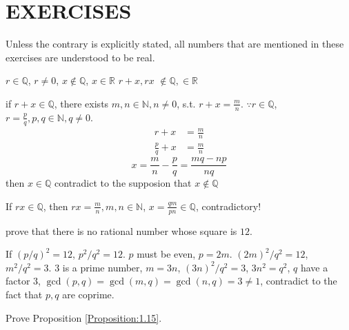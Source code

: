 \section*{EXERCISES}

Unless the contrary is explicitly stated, all numbers that are mentioned in these exercises are understood to be real.

\begin{myExercise}
    $r \in \mathbb{Q}$, $r \neq 0$, $x \not\in \mathbb{Q}$, $x \in \mathbb{R}$
    $r+x, rx$ $\not\in \mathbb{Q}, \in \mathbb{R}$
\end{myExercise}

\begin{mySolve}
if $r+x \in \mathbb{Q}$, there exists $m, n \in \mathbb{N}, n \neq 0$, s.t. $r+x = \frac{m}{n}$.
$\because r\in \mathbb{Q}$, $r = \frac{p}{q}, p,q \in \mathbb{N}, q \neq 0$.
\begin{align*}
    r + x &= \frac{m}{n}\\
    \frac{p}{q} + x &= \frac{m}{n}
\end{align*}
\begin{equation*}
    x = \frac{m}{n} - \frac{p}{q} = \frac{mq-np}{nq}
\end{equation*}
then $x \in \mathbb{Q}$ contradict to the supposion that $x \not\in \mathbb{Q}$

If $rx \in \mathbb{Q}$, then $rx = \frac{m}{n}, m,n\in \mathbb{N}$, $x = \frac{qm}{pn} \in \mathbb{Q}$, contradictory!
\end{mySolve}



\begin{myExercise}
   prove that there is no rational number whose square is $12$. 
\end{myExercise}

\begin{mySolve}
    If $\left(p/q\right)^2 = 12$, $p^2/q^2 = 12$. $p$ must be even, $p = 2m$.
    $(2m)^2/q^2 = 12$, $m^2/q^2=3$. 
    $3$ is a prime number, $m = 3n$, $(3n)^2/q^2 = 3$, $3n^2 = q^2$, $q$ have a factor $3$,
    $\gcd(p,q) = \gcd(m,q) = \gcd(n,q) = 3 \neq 1$, contradict to the fact that $p,q$ are coprime.
\end{mySolve}

\begin{myExercise}
    Prove Proposition \ref{Proposition:1.15}.
\end{myExercise}

